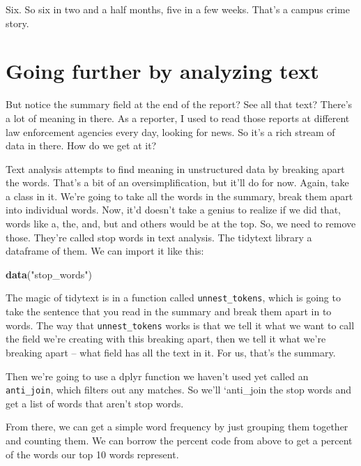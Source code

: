 \documentclass[]{book}
\newenvironment{Shaded}{\begin{snugshade}}{\end{snugshade}}
\newcommand{\KeywordTok}[1]{\textcolor[rgb]{0.13,0.29,0.53}{\textbf{#1}}}
\newcommand{\NormalTok}[1]{#1}
\newcommand{\StringTok}[1]{\textcolor[rgb]{0.31,0.60,0.02}{#1}}
\begin{document}
Six. So six in two and a half months, five in a few weeks. That's a campus crime story.

\hypertarget{going-further-by-analyzing-text}{%
\section{Going further by analyzing text}\label{going-further-by-analyzing-text}}

But notice the summary field at the end of the report? See all that text? There's a lot of meaning in there. As a reporter, I used to read those reports at different law enforcement agencies every day, looking for news. So it's a rich stream of data in there. How do we get at it?

Text analysis attempts to find meaning in unstructured data by breaking apart the words. That's a bit of an oversimplification, but it'll do for now. Again, take a class in it. We're going to take all the words in the summary, break them apart into individual words. Now, it'd doesn't take a genius to realize if we did that, words like a, the, and, but and others would be at the top. So, we need to remove those. They're called stop words in text analysis. The tidytext library a dataframe of them. We can import it like this:

\begin{Shaded}
\begin{Highlighting}[]
\KeywordTok{data}\NormalTok{(}\StringTok{"stop_words"}\NormalTok{)}
\end{Highlighting}
\end{Shaded}

The magic of tidytext is in a function called \texttt{unnest\_tokens}, which is going to take the sentence that you read in the summary and break them apart in to words. The way that \texttt{unnest\_tokens} works is that we tell it what we want to call the field we're creating with this breaking apart, then we tell it what we're breaking apart -- what field has all the text in it. For us, that's the summary.

Then we're going to use a dplyr function we haven't used yet called an \texttt{anti\_join}, which filters out any matches. So we'll `anti\_join the stop words and get a list of words that aren't stop words.

From there, we can get a simple word frequency by just grouping them together and counting them. We can borrow the percent code from above to get a percent of the words our top 10 words represent.
\end{document}
